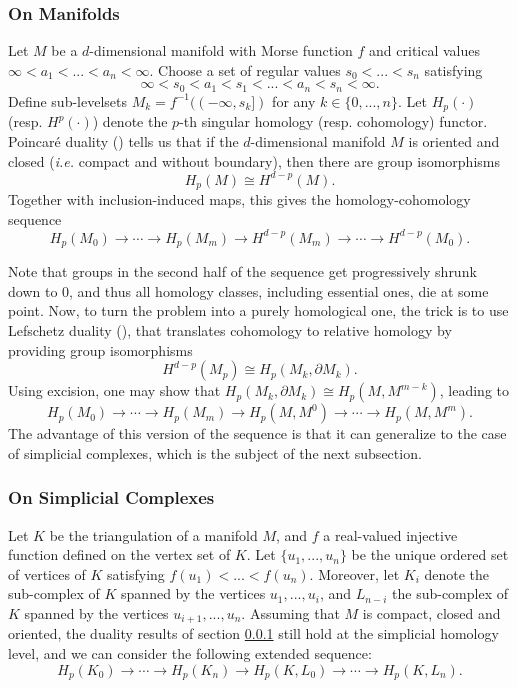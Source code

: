 \documentclass[11pt]{article}
\theoremstyle{remark}
\begin{document}
\subsubsection{On Manifolds}
\label{manifolds}

\noindent Let $M$ be a $d$-dimensional manifold with Morse function $f$ and critical values $\infty<a_1<...<a_n<\infty$. Choose a set of regular values $s_0<...<s_n$ satisfying $$\infty<s_0<a_1<s_1<...<a_n<s_n<\infty.$$ Define sub-levelsets $M_k=f^{-1}((-\infty,s_k])$ for any $k\in\{0,...,n\}$. Let $H_p(\cdot)$ (resp. $H^p(\cdot)$) denote the $p$-th singular homology (resp. cohomology) functor. Poincaré duality (\autocite[Section~3.3]{Hatcher:478079}) tells us that if the $d$-dimensional manifold $M$ is oriented and closed (\textit{i.e.} compact and without boundary), then there are group isomorphisms $$H_p(M)\cong H^{d-p}(M).$$ Together with inclusion-induced maps, this gives the homology-cohomology sequence $$H_p(M_0)\rightarrow \cdots \rightarrow H_p(M_m)\rightarrow H^{d-p}(M_m)\rightarrow \cdots\rightarrow H^{d-p}(M_0).$$ 

\noindent Note that groups in the second half of the sequence get progressively shrunk down to $0$, and thus all homology classes, including essential ones, die at some point. Now, to turn the problem into a purely homological one, the trick is to use Lefschetz duality (\autocite[Theorem~3.43]{Hatcher:478079}), that translates cohomology to relative homology by providing group isomorphisms $$H^{d-p}(M_p)\cong H_p(M_k,\partial M_k).$$ 
\noindent Using excision, one may show that $H_p(M_k,\partial M_k)\cong H_p(M,M^{m-k})$, leading to 
$$H_p(M_0)\rightarrow \cdots \rightarrow H_p(M_m)\rightarrow H_p(M,M^{0})\rightarrow \cdots\rightarrow H_p(M,M^{m}).$$ 
\noindent The advantage of this version of the sequence is that it can generalize to the case of simplicial complexes, which is the subject of the next subsection.

\subsubsection{On Simplicial Complexes}

Let $K$ be the triangulation of a manifold $M$, and $f$ a real-valued injective function defined on the vertex set of $K$. Let $\{u_1,...,u_n\}$ be the unique ordered set of vertices of $K$ satisfying $f(u_1)<...<f(u_n)$. Moreover, let $K_i$ denote the sub-complex of $K$ spanned by the vertices $u_1,...,u_i$, and $L_{n-i}$ the sub-complex of $K$ spanned by the vertices $u_{i+1},...,u_n$. Assuming that $M$ is compact, closed and oriented, the duality results of section \ref{manifolds} still hold at the simplicial homology level, and we can consider the following extended sequence:
$$H_p(K_0)\rightarrow \cdots \rightarrow H_p(K_n)\rightarrow H_p(K,L_0)\rightarrow \cdots\rightarrow H_p(K,L_n).$$ 
\noindent  \\
\end{document}
